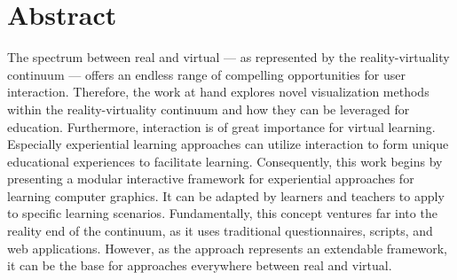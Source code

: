 %





\chapter*{Abstract}
\label{sec:abstract}
\vspace*{-10mm}

The spectrum between real and virtual --- as represented by the reality-virtuality continuum --- offers an endless range of compelling opportunities for user interaction. Therefore, the work at hand explores novel visualization methods within the reality-virtuality continuum and how they can be leveraged for education.
Furthermore, interaction is of great importance for virtual learning. Especially experiential learning approaches can utilize interaction to form unique educational experiences to facilitate learning.
Consequently, this work begins by presenting a modular interactive framework for experiential approaches for learning computer graphics. It can be adapted by learners and teachers to apply to specific learning scenarios. Fundamentally, this concept ventures far into the reality end of the continuum, as it uses traditional questionnaires, scripts, and web applications. However, as the approach represents an extendable framework, it can be the base for approaches everywhere between real and virtual.

